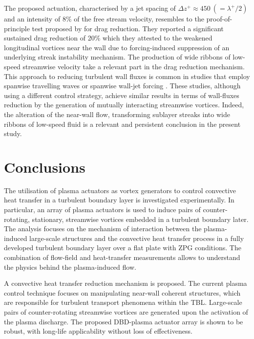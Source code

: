 The proposed actuation, characterised by a jet spacing of $\Delta z^+ \approx 450 ~(=\lambda^+/2)$ and an intensity of $8\%$ of the free stream velocity, resembles to the proof-of-principle test proposed by \citet{Schoppa1998} for drag reduction. They reported a significant sustained drag reduction of 20\% which they attested to the weakened longitudinal vortices near the wall due to forcing-induced suppression of an underlying streak instability mechanism. The production of wide ribbons of low-speed streamwise velocity take a relevant part in the drag reduction mechanism. This approach to reducing turbulent wall fluxes is common in studies that employ spanwise travelling waves \citep{Du2002, Whalley2014} or spanwise wall-jet forcing \citep{yao2017,yao2018}. These studies, although using a different control strategy, achieve similar results in terms of wall-fluxes reduction by the generation of mutually interacting streamwise vortices. Indeed, the alteration of the near-wall flow, transforming sublayer streaks into wide ribbons of low-speed fluid is a relevant and persistent conclusion in the present study.

\section{Conclusions} \label{s:conclusions}
The utilisation of plasma actuators as vortex generators to control convective heat transfer in a turbulent boundary layer is investigated experimentally. In particular, an array of plasma actuators is used to induce pairs of counter-rotating, stationary, streamwise vortices embedded in a turbulent boundary later. The analysis focuses on the mechanism of interaction between the plasma-induced large-scale structures and the convective heat transfer process in a fully developed turbulent boundary layer over a flat plate with ZPG conditions. The combination of flow-field and heat-transfer measurements allows to understand the physics behind the plasma-induced flow.

A convective heat transfer reduction mechanism is proposed. The current plasma control technique focuses on manipulating near-wall coherent structures, which are responsible for turbulent transport phenomena within the TBL. Large-scale pairs of counter-rotating streamwise vortices are generated upon the activation of the plasma discharge. The proposed DBD-plasma actuator array is shown to be robust, with long-life applicability without loss of effectiveness.

